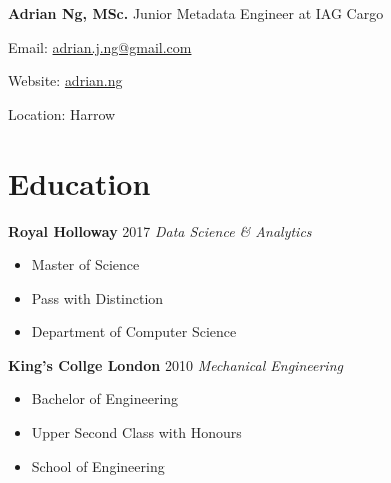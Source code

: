 \documentclass[letterpaper,11pt]{article}
\begin{document}
\noindent
\Large
\textbf{Adrian Ng, MSc.}
\newline
\small
Junior Metadata Engineer at IAG Cargo
\newline
\begin{description*}
	\item[Email:] \href{mailto:contact@adrian.ng}{adrian.j.ng@gmail.com}
	\item[Website:] \href{https://adrian.ng}{adrian.ng}
	\item[Location:] Harrow
\end{description*}
\hfill
\vspace{0.25cm}
\noindent

\hspace{0.2cm}
\begin{minipage}[t]{0.3\linewidth}
	\section{Education}
	\textbf{Royal Holloway} \hfill 2017
	\newline
	\textit{Data Science \& Analytics}
	\begin{itemize}[leftmargin=*, itemsep=0.1em]
		\item	Master of Science
		\item	Pass with Distinction
		\item 	Department of Computer Science
	\end{itemize}
	\vspace{0.15cm}
	\textbf{King's Collge London} \hfill 2010
	\newline
	\textit{Mechanical Engineering}
	\begin{itemize}[leftmargin=*, itemsep=0.1em]
		\item Bachelor of Engineering
		\item Upper Second Class with Honours
		\item School of Engineering
	\end{itemize}
\end{minipage}
\hspace{0.2cm}
\end{document}
